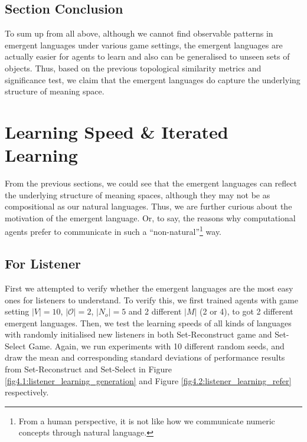 \subsection{Section Conclusion}
\label{ssec4.2.5:sec_conclusion}

To sum up from all above, although we cannot find observable patterns in emergent languages under various game settings, the emergent languages are actually easier for agents to learn and also can be generalised to unseen sets of objects. Thus, based on the previous topological similarity metrics and significance test, we claim that the emergent languages do capture the underlying structure of meaning space.


\section{Learning Speed \& Iterated Learning}
\label{sec4.3:learning_speed}

From the previous sections, we could see that the emergent languages can reflect the underlying structure of meaning spaces, although they may not be as compositional as our natural languages. Thus, we are further curious about the motivation of the emergent language. Or, to say, the reasons why computational agents prefer to communicate in such a ``non-natural''\footnote{From a human perspective, it is not like how we communicate numeric concepts through natural language.} way.

\subsection{For Listener}
\label{ssec4.3.1:learning_listener}

First we attempted to verify whether the emergent languages are the most easy ones for listeners to understand. To verify this, we first trained agents with game setting $|V|=10$, $|\mathcal{O}|=2$, $|N_{o}|=5$ and 2 different $|M|$ (2 or 4), to got 2 different emergent languages. Then, we test the learning speeds of all kinds of languages with randomly initialised new listeners in both Set-Reconstruct game and Set-Select Game. Again, we run experiments with 10 different random seeds, and draw the mean and corresponding standard deviations of performance results from Set-Reconstruct and Set-Select in Figure \ref{fig4.1:listener_learning_generation} and Figure \ref{fig4.2:listener_learning_refer} respectively.


